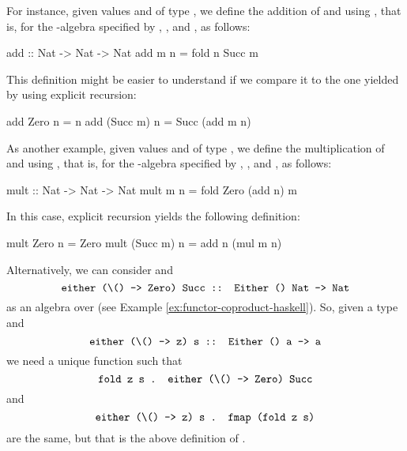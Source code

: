 \begin{example}
  For instance, given values  and  of
  type , we define the addition of 
  and  using , that is,
   for the -algebra specified by
  , , and , as
  follows:
  \begin{codehaskell}
add :: Nat -> Nat -> Nat
add m n = fold n Succ m
  \end{codehaskell}
  This definition might be easier to understand if we compare it to
  the one yielded by using explicit recursion:
  \begin{codehaskell}
add Zero     n = n
add (Succ m) n = Succ (add m n)
  \end{codehaskell}

  As another example, given values  and 
  of type , we define the multiplication of
   and  using , that is,  for the
  -algebra specified by ,
  , and , as follows:
  \begin{codehaskell}
mult :: Nat -> Nat -> Nat
mult m n = fold Zero (add n) m
  \end{codehaskell}
  In this case, explicit recursion yields the following definition:
  \begin{codehaskell}
mult Zero     n = Zero
mult (Succ m) n = add n (mul m n)
  \end{codehaskell}

\end{example}

Alternatively, we can consider  and
\begin{equation*}
  \text{\texttt{either (\textbackslash () -> Zero) Succ :: Either () Nat -> Nat}}
\end{equation*}
as an algebra over  (see Example
\ref{ex:functor-coproduct-haskell}). So, given a type 
and
\begin{equation*}
  \text{\texttt{either (\textbackslash () -> z) s :: Either () a -> a}}
\end{equation*}
we need a unique function  such that
\begin{equation*}
  \text{\texttt{fold z s . either (\textbackslash () -> Zero) Succ}}
\end{equation*}
and
\begin{equation*}
  \text{\texttt{either (\textbackslash () -> z) s . fmap (fold z s)}}
\end{equation*}
are the same, but that is the above definition of .

